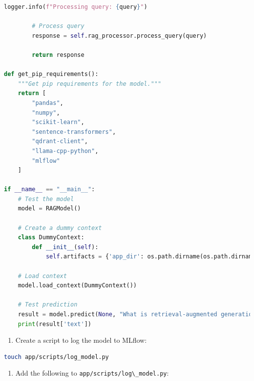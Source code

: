 \documentclass[
  screen,review,acmlarge]{acmart}
\newcommand{\passthrough}[1]{#1}
\providecommand{\tightlist}{%
  \setlength{\itemsep}{0pt}\setlength{\parskip}{0pt}}
\begin{document}
\begin{lstlisting}[language=Python]
        logger.info(f"Processing query: {query}")
        
        # Process query
        response = self.rag_processor.process_query(query)
        
        return response

def get_pip_requirements():
    """Get pip requirements for the model."""
    return [
        "pandas",
        "numpy",
        "scikit-learn",
        "sentence-transformers",
        "qdrant-client",
        "llama-cpp-python",
        "mlflow"
    ]

if __name__ == "__main__":
    # Test the model
    model = RAGModel()
    
    # Create a dummy context
    class DummyContext:
        def __init__(self):
            self.artifacts = {'app_dir': os.path.dirname(os.path.dirname(os.path.abspath(__file__)))}
    
    # Load context
    model.load_context(DummyContext())
    
    # Test prediction
    result = model.predict(None, "What is retrieval-augmented generation?")
    print(result['text'])
\end{lstlisting}

\begin{enumerate}
\def\labelenumi{\arabic{enumi}.}
\setcounter{enumi}{2}
\tightlist
\item
  Create a script to log the model to MLflow:
\end{enumerate}

\begin{lstlisting}[language=bash]
touch app/scripts/log_model.py
\end{lstlisting}

\begin{enumerate}
\def\labelenumi{\arabic{enumi}.}
\setcounter{enumi}{3}
\tightlist
\item
  Add the following to \passthrough{\lstinline!app/scripts/log\_model.py!}:
\end{enumerate}
\end{document}
